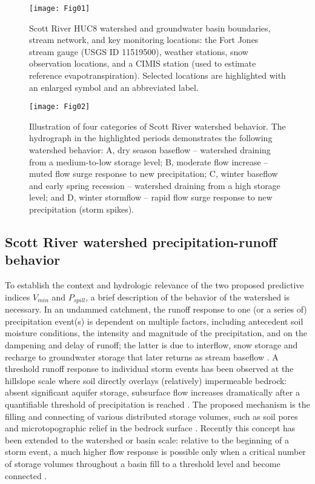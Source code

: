 \documentclass[hess, manuscript]{copernicus}
\begin{document}
\begin{figure}
\texttt{[image: Fig01]} \caption{\label{fig:watershed_fig_ch3} Scott River HUC8 watershed and groundwater basin boundaries, stream network, and key monitoring locations: the Fort Jones stream gauge (USGS ID 11519500), weather stations, snow observation locations, and a CIMIS station (used to estimate reference evapotranspiration). Selected locations are highlighted with an enlarged symbol and an abbreviated label.}\label{fig:watershed_fig_ch3}
\end{figure}

\begin{figure}
\texttt{[image: Fig02]} \caption{\label{fig:watershed_4states_illustration} Illustration of four categories of Scott River watershed behavior. The hydrograph in the highlighted periods demonstrates the following watershed behavior: A, dry season baseflow -- watershed draining from a medium-to-low storage level; B, moderate flow increase  -- muted flow surge response to new precipitation; C, winter baseflow and early spring recession -- watershed draining from a high storage level; and D, winter stormflow -- rapid flow surge response to new precipitation (storm spikes).}\label{fig:watershed_4states_illustration}
\end{figure}

\subsection{Scott River watershed precipitation-runoff behavior}

To establish the context and hydrologic relevance of the two proposed
predictive indices $V_{min}$ and $P_{spill}$, a brief description of
the behavior of the watershed is necessary. In an undammed catchment,
the runoff response to one (or a series of) precipitation event(s) is
dependent on multiple factors, including antecedent soil moisture
conditions, the intensity and magnitude of the precipitation, and on the
dampening and delay of runoff; the latter is due to interflow, snow
storage and recharge to groundwater storage that later returns as stream
baseflow \citep{Tarboton2003}. A threshold runoff response to individual
storm events has been observed at the hillslope scale where soil
directly overlays (relatively) impermeable bedrock: absent significant
aquifer storage, subsurface flow increases dramatically after a
quantifiable threshold of precipitation is reached
\citep{Tromp-VanMeerveld2006}. The proposed mechanism is the filling and
connecting of various distributed storage volumes, such as soil pores
and microtopographic relief in the bedrock surface
\citep{Tromp-VanMeerveld2006}. Recently this concept has been extended
to the watershed or basin scale: relative to the beginning of a storm
event, a much higher flow response is possible only when a critical
number of storage volumes throughout a basin fill to a threshold level
and become connected \citep{McDonnell2021}.
\end{document}
